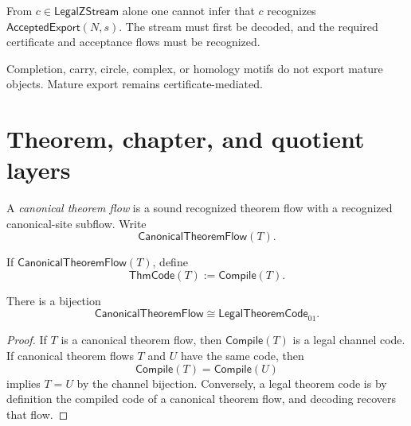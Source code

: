 \begin{corollary}
\label{cor:main-theorems-code-existence-not-export}
From $c\in\mathsf{LegalZStream}$ alone one cannot infer that $c$ recognizes $\mathsf{AcceptedExport}(N,s)$. The stream must first be decoded, and the required certificate and acceptance flows must be recognized.
\end{corollary}

\begin{corollary}
\label{cor:main-theorems-motif-existence-not-export}
Completion, carry, circle, complex, or homology motifs do not export mature objects. Mature export remains certificate-mediated.
\end{corollary}

\section{Theorem, chapter, and quotient layers}
\label{sec:main-theorems-theorem-chapter-quotient}

\begin{definition}
\label{def:main-theorems-canonical-theorem-flow}
A \emph{canonical theorem flow} is a sound recognized theorem flow with a recognized canonical-site subflow. Write
$$
  \mathsf{CanonicalTheoremFlow}(T).
$$
\end{definition}

\begin{definition}
\label{def:main-theorems-theorem-code}
If $\mathsf{CanonicalTheoremFlow}(T)$, define
$$
  \mathsf{ThmCode}(T):=\mathsf{Compile}(T).
$$
\end{definition}

\begin{theorem}
\label{thm:main-theorems-theorem-code-bijection}
There is a bijection
$$
  \boxed{
  \mathsf{CanonicalTheoremFlow}
  \cong
  \mathsf{LegalTheoremCode}_{01}.
  }
$$
\end{theorem}

\begin{proof}
If $T$ is a canonical theorem flow, then $\mathsf{Compile}(T)$ is a legal channel code. If canonical theorem flows $T$ and $U$ have the same code, then
$$
  \mathsf{Compile}(T)=\mathsf{Compile}(U)
$$
implies $T=U$ by the channel bijection. Conversely, a legal theorem code is by definition the compiled code of a canonical theorem flow, and decoding recovers that flow.
\end{proof}

